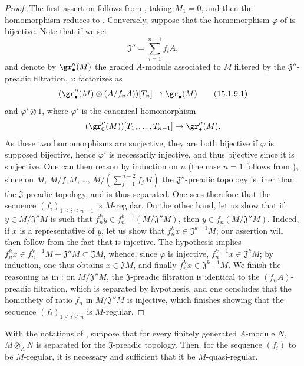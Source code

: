 \begin{proof}
The first assertion follows from , taking $M_1=0$, and then the homomorphism  reduces to .
Conversely, suppose that the homomorphism $\varphi$ of  is bijective.
Note that if we set
\[
  \mathfrak{J}''=\sum_{i=1}^{n-1}f_iA,
\]
and denote by $\gr''_\bullet(M)$ the graded $A$-module associated to $M$ filtered by the $\mathfrak{J}''$-preadic filtration, $\varphi$ factorizes as
\[
\label{0.15.1.9.1}
  (\gr''_\bullet(M)\otimes(A/f_nA))[T_n] \to \gr_\bullet(M)
\tag{15.1.9.1}
\]
and $\varphi'\otimes 1$, where $\varphi'$ is the canonical homomorphism
\[
  (\gr''_0(M))[T_1,\ldots,T_{n-1}] \to \gr''_\bullet(M).
\]
As these two homomorphisms are surjective, they are both bijective if $\varphi$ is supposed bijective, hence $\varphi'$ is necessarily injective, and thus bijective since it is surjective.
One can then reason by induction on $n$ (the case $n=1$ follows from ), since on $M$, $M/f_1M$, \ldots, $M/(\sum_{j=1}^{n-2}f_jM)$ the $\mathfrak{J}''$-preadic topology is finer than the $\mathfrak{J}$-preadic topology, and is thus separated.
One sees therefore that the sequence $(f_i)_{1\leq i\leq n-1}$ is $M$-regular.
On the other hand, let us show that if $y\in M/\mathfrak{J}''M$ is such that $f_n^ky\in f_n^{k+1}(M/\mathfrak{J}''M)$, then $y\in f_n(M/\mathfrak{J}''M)$.
Indeed, if $x$ is a representative of $y$, let us show that $f_n^kx\in\mathfrak{J}^{k+1}M$;
our assertion will then follow from the fact that  is injective.
The hypothesis implies $f_n^kx\in f_n^{k+1}M+\mathfrak{J}''M\subset\mathfrak{J}M$, whence, since $\varphi$ is injective, $f_n^{k-1}x\in\mathfrak{J}^kM$;
by induction, one thus obtains $x\in\mathfrak{J}M$, and finally $f_n^kx\in\mathfrak{J}^{k+1}M$.
We finish the reasoning as in :
on $M/\mathfrak{J}''M$, the $\mathfrak{J}$-preadic filtration is identical to the $(f_nA)$-preadic filtration, which is separated by hypothesis, and one concludes that the homothety of ratio $f_n$ in $M/\mathfrak{J}''M$ is injective, which finishes showing that the sequence $(f_i)_{1\leq i\leq n}$ is $M$-regular.
\end{proof}

\begin{corollary}[15.1.10]
\label{0.15.1.10}
With the notations of , suppose that for every finitely generated $A$-module $N$, $M\otimes_AN$ is separated for the $\mathfrak{J}$-preadic topology.
Then, for the sequence $(f_i)$ to be $M$-regular, it is necessary and sufficient that it be $M$-quasi-regular.
\end{corollary}

